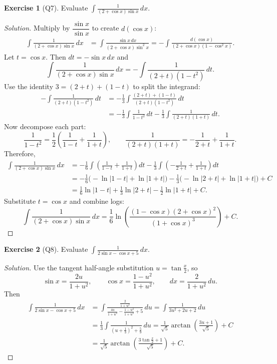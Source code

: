 \documentclass[11pt]{article}
\theoremstyle{definition}
\newtheorem{exercise}{Exercise}[section]
\newenvironment{solution}{\begin{proof}[Solution]}{\end{proof}}
\begin{document}
\begin{exercise}[Q7]
Evaluate $\displaystyle \int \frac{1}{(2+\cos x)\sin x}\,dx$.
\end{exercise}

\begin{solution}
Multiply by $\dfrac{\sin x}{\sin x}$ to create $d(\cos x)$:
\begin{align*}
\int \frac{1}{(2+\cos x)\sin x}\,dx
&=\int \frac{\sin x\,dx}{(2+\cos x)\sin^2 x}
=-\int \frac{d(\cos x)}{(2+\cos x)(1-\cos^2 x)}.
\end{align*}
Let $t=\cos x$. Then $dt=-\sin x\,dx$ and
\[
\int \frac{1}{(2+\cos x)\sin x}\,dx
=-\int \frac{1}{(2+t)(1-t^2)}\,dt.
\]
Use the identity $3=(2+t)+(1-t)$ to split the integrand:
\begin{align*}
-\int \frac{1}{(2+t)(1-t^2)}\,dt
&=-\frac{1}{3}\int \frac{(2+t)+(1-t)}{(2+t)(1-t^2)}\,dt \\
&=-\frac{1}{3}\int \frac{1}{1-t^2}\,dt-\frac{1}{3}\int \frac{1}{(2+t)(1+t)}\,dt.
\end{align*}
Now decompose each part:
\[
\frac{1}{1-t^2}=\frac{1}{2}\left(\frac{1}{1-t}+\frac{1}{1+t}\right),
\qquad
\frac{1}{(2+t)(1+t)}=-\frac{1}{2+t}+\frac{1}{1+t}.
\]
Therefore,
\begin{align*}
\int \frac{1}{(2+\cos x)\sin x}\,dx
&=-\frac{1}{6}\int\left(\frac{1}{1-t}+\frac{1}{1+t}\right)dt
-\frac{1}{3}\int\left(-\frac{1}{2+t}+\frac{1}{1+t}\right)dt \\
&=-\frac{1}{6}\bigl(-\ln|1-t|+\ln|1+t|\bigr)
-\frac{1}{3}\bigl(-\ln|2+t|+\ln|1+t|\bigr)+C \\
&=\frac{1}{6}\ln|1-t|+\frac{1}{3}\ln|2+t|-\frac{1}{2}\ln|1+t|+C.
\end{align*}
Substitute $t=\cos x$ and combine logs:
\[
\int \frac{1}{(2+\cos x)\sin x}\,dx
=\frac{1}{6}\ln\left(\frac{(1-\cos x)(2+\cos x)^2}{(1+\cos x)^3}\right)+C.
\]
\end{solution}

\begin{exercise}[Q8]
Evaluate $\displaystyle \int \frac{1}{2\sin x-\cos x+5}\,dx$.
\end{exercise}

\begin{solution}
Use the tangent half-angle substitution $u=\tan\frac{x}{2}$, so
\[
\sin x=\frac{2u}{1+u^2},\qquad \cos x=\frac{1-u^2}{1+u^2},\qquad dx=\frac{2}{1+u^2}\,du.
\]
Then
\begin{align*}
\int \frac{1}{2\sin x-\cos x+5}\,dx
&=\int \frac{\frac{2}{1+u^2}}{\frac{4u}{1+u^2}-\frac{1-u^2}{1+u^2}+5}\,du
=\int \frac{1}{3u^2+2u+2}\,du \\
&=\frac{1}{3}\int \frac{1}{\left(u+\frac{1}{3}\right)^2+\frac{5}{9}}\,du
=\frac{1}{\sqrt{5}}\arctan\left(\frac{3u+1}{\sqrt{5}}\right)+C \\
&=\frac{1}{\sqrt{5}}\arctan\left(\frac{3\tan\frac{x}{2}+1}{\sqrt{5}}\right)+C.
\end{align*}
\end{solution}
\end{document}
